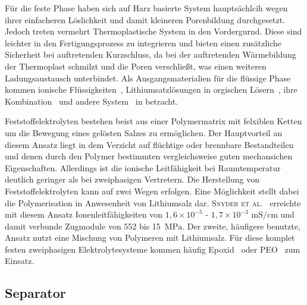 Für die feste Phase haben sich auf Harz basierte System hauptsächlcih wegen ihrer einfacheren Löslichkeit und damit kleineren Porenbildung durchgesetzt. Jedoch treten vermehrt Thermoplastische System in den Vordergurnd. Diese sind leichter in den Fertigungsprozess zu integrieren und bieten einen zusätzliche Sicherheit bei auftretenden Kurzschluss, da bei der auftretenden Wärmebildung der Thermoplast schmilzt und die Poren verschließt, was einen weiteren Ladungsaustausch unterbindet.
Als Ausgangsmaterialien für die flüssige Phase kommen ionische Flüssigkeiten~\cite{Huang2022,Shirshova2013,Wendong2021,Shirshova2014,Dzienia2020}, Lithiumsatzlösungen in orgischen Lösern~\cite{Gienger2015,Sakakibara2017}, ihre Kombination~\cite{Shirshova2014,Yu2016} und andere System~\cite{Feng2017} in betracht.


Feststoffelektrolyten bestehen beist aus einer Polymermatrix mit felxiblen Ketten um die Bewegung eines gelösten Salzes zu ermöglichen. Der Hauptvorteil an diesem Ansatz liegt in dem Verzicht auf flüchtige oder brennbare Bestandteilen und denen durch den Polymer bestimmten vergleichsweise guten mechansichen Eigenschaften. Allerdings ist die ionische Leitfähigkeit bei Raumtemperatur deutlich geringer als bei zweiphasigen Vertretern. Die Herstellung von Feststoffelektrolyten kann auf zwei Wegen erfolgen. Eine Möglichkeit stellt dabei die Polymerisation in Anwesenheit von Lithiumsalz dar. \textsc{Snyder et al.}~\cite{Snyder2007, Snyder2009} erreichte mit diesem Ansatz Ionenleitfähigkeiten von $1,6 \times 10^{-5}$ - $1,7 \times 10^{-3}$ $\si{\milli \siemens \per \cm}$ und damit verbunde Zugmodule von 552 bis 15~$\si{\MPa}$. Der zweite, häufigere benutzte, Ansatz nutzt eine Mischung von Polymeren mit Lithiumsalz. Für diese komplet festen zweiphasigen Elektrolytesysteme kommen häufig Epoxid~\cite{Matsumoto2011,Munoz2021,Wang2020b} oder PEO~\cite{Moreno2011,Ji2010,Guo2021} zum Einsatz.


\subsection{Separator}



